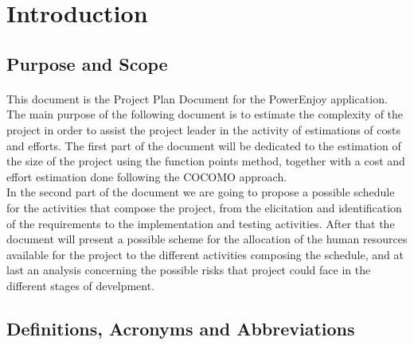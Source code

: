 \documentclass[a4paper,10pt]{article}
\begin{document}
\maketitle
\section{Introduction}
\subsection{Purpose and Scope}
\paragraph{} This document is the Project Plan Document for the PowerEnjoy application. The main purpose of the following document is to estimate the complexity
of the project in order to assist the project leader in the activity of estimations of costs and efforts. 
The first part of the document will be dedicated to the estimation of the size of the project using the function points method, together with a cost and effort
estimation done following the COCOMO approach.  \\
In the second part of the document we are going to propose a possible schedule for the activities that compose the project, from the elicitation and identification
of the requirements to the implementation and testing activities. After that the document will present a possible scheme for the allocation of the 
human resources available for the project to the different activities composing the schedule, and at last an analysis concerning the possible 
risks that project could face in the different stages of develpment.
  
\subsection{Definitions, Acronyms and Abbreviations}
\end{document}
